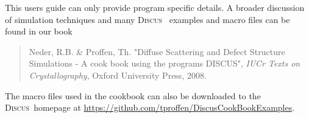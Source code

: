 \documentclass[11pt]{report}
\newcommand{\Discus}{\textsc{Discus\ }}
\begin{document}
This users guide can only provide program specific details. A
broader discussion of simulation techniques and many \Discus
examples and macro files can be found in our book

\begin{quote}
  {\sc Neder, R.B. \& Proffen, Th.} "Diffuse Scattering and Defect Structure
  Simulations - A cook book using the programs DISCUS", {\it IUCr Texts on
  Crystallography}, Oxford University Press, 2008.
\end{quote}


The macro files used in the cookbook can also be downloaded to the 
\Discus homepage at \url{https://github.com/tproffen/DiscusCookBookExamples}.


\tableofcontents

%
%














\appendix





\end{document}
